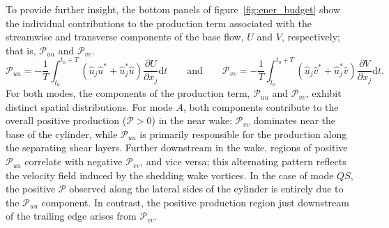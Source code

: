 To provide further insight, the bottom panels of figure~\ref{fig:ener_budget} show the individual contributions to the production term associated with the streamwise and transverse components of the base flow, $U$ and $V$, respectively; that is, $\mathcal{P}_{uu}$ and $\mathcal{P}_{vv}$.
%
\begin{equation}
  \mathcal{P}_{uu} = - \frac{1}{T} \int_{t_0}^{t_0+T} \left( \hat{u}_j \hat{u}^* + \hat{u}_j^* \hat{u} \right) \frac{\partial U}{\partial x_j} \text{d} t \qquad \text{and} \qquad
\mathcal{P}_{vv} = - \frac{1}{T} \int_{t_0}^{t_0+T} \left( \hat{u}_j \hat{v}^* + \hat{u}_j^* \hat{v} \right) \frac{\partial V}{\partial x_j} \text{d} t.
\end{equation}
%
For both modes, the components of the production term, $\mathcal{P}_{uu}$ and $\mathcal{P}_{vv}$, exhibit distinct spatial distributions. For mode $A$, both components contribute to the overall positive production ($\mathcal{P} > 0$) in the near wake: $\mathcal{P}_{vv}$ dominates near the base of the cylinder, while $\mathcal{P}_{uu}$ is primarily responsible for the production along the separating shear layers. Further downstream in the wake, regions of positive $\mathcal{P}_{uu}$ correlate with negative $\mathcal{P}_{vv}$, and vice versa; this alternating pattern reflects the velocity field induced by the shedding wake vortices.
%
In the case of mode $QS$, the positive $\mathcal{P}$ observed along the lateral sides of the cylinder is entirely due to the $\mathcal{P}_{uu}$ component. In contrast, the positive production region just downstream of the trailing edge arises from $\mathcal{P}_{vv}$.


